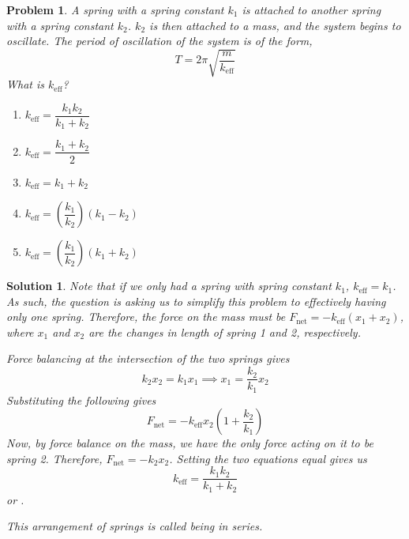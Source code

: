 \documentclass[12pt]{article}
\newcommand{\clearpts}{\addtocounter{tpts}{\value{cpts}} \setcounter{cpts}{0}}
\newcommand{\pts}[1]{\clearpts \setcounter{cpts}{#1}}
\newtheorem*{solution}{Solution}
\theoremstyle{mystyle}
\newtheorem{pproblem}{Problem}
\begin{document}
\pts{2}
\begin{pproblem}
    A spring with a spring constant $k_1$ is attached to another spring with a spring constant
    $k_2$. $k_2$ is then attached to a mass, and the system begins to oscillate.
    The period of oscillation of the system
    is of the form, \[
        T=2\pi\sqrt{\dfrac{m}{k_\mathrm{eff}}}
    \]
    What is $k_\mathrm{eff}$?
    \begin{figure}[H]
        \centering
    \end{figure}
    \begin{enumerate}[label=(\Alph*)]
        \item $k_\mathrm{eff}=\dfrac{k_1k_2}{k_1+k_2}$
        \item $k_\mathrm{eff}=\dfrac{k_1+k_2}{2}$
        \item $k_\mathrm{eff}=k_1+k_2$
        \item $k_\mathrm{eff}=\left(\dfrac{k_1}{k_2}\right)(k_1-k_2)$
        \item $k_\mathrm{eff}=\left(\dfrac{k_1}{k_2}\right)(k_1+k_2)$
    \end{enumerate}
\end{pproblem}
\begin{solution}
    Note that if we only had a spring with spring constant $k_1$, $k_\mathrm{eff}=k_1$.
    As such, the question is asking us to simplify this problem to effectively
    having only one spring. Therefore, the force on the mass must be
    $F_\mathrm{net}=-k_\mathrm{eff}(x_1+x_2)$,
    where $x_1$ and $x_2$ are the changes in length of spring 1 and 2, respectively.

    Force balancing at the intersection of the two springs gives \[
        k_2x_2=k_1x_1\implies x_1=\dfrac{k_2}{k_1}x_2
    \]
    Substituting the following gives \[
        F_\mathrm{net}=-k_\mathrm{eff}x_2\left(1+\dfrac{k_2}{k_1}\right)
    \]
    Now, by force balance on the mass, we have the only force acting on it to be spring 2.
    Therefore, $F_\mathrm{net}=-k_2x_2$. Setting the two equations equal gives us \[
        k_\mathrm{eff}=\dfrac{k_1k_2}{k_1+k_2}
    \] or .

    This arrangement of springs is called being in \textit{series}.
\end{solution}
\end{document}
